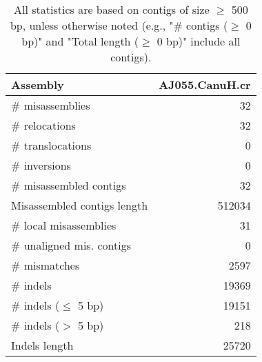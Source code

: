 \documentclass[12pt,a4paper]{article}
\begin{document}
\begin{table}[ht]
\begin{center}
\caption{All statistics are based on contigs of size $\geq$ 500 bp, unless otherwise noted (e.g., "\# contigs ($\geq$ 0 bp)" and "Total length ($\geq$ 0 bp)" include all contigs).}
\begin{tabular}{|l*{1}{|r}|}
\hline
Assembly & AJ055.CanuH.cr \\ \hline
\# misassemblies & 32 \\ \hline
\hspace{5mm}\# relocations & 32 \\ \hline
\hspace{5mm}\# translocations & 0 \\ \hline
\hspace{5mm}\# inversions & 0 \\ \hline
\# misassembled contigs & 32 \\ \hline
Misassembled contigs length & 512034 \\ \hline
\# local misassemblies & 31 \\ \hline
\# unaligned mis. contigs & 0 \\ \hline
\# mismatches & 2597 \\ \hline
\# indels & 19369 \\ \hline
\hspace{5mm}\# indels ($\leq$ 5 bp) & 19151 \\ \hline
\hspace{5mm}\# indels ($>$ 5 bp) & 218 \\ \hline
Indels length & 25720 \\ \hline
\end{tabular}
\end{center}
\end{table}
\end{document}
